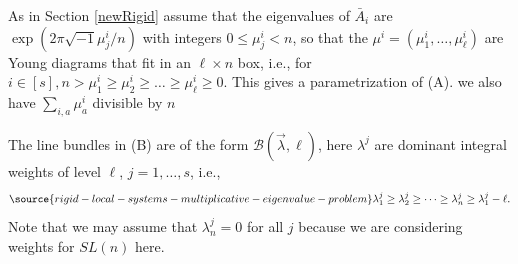 \iffalse
As in Section \ref{newRigid} assume  that the  eigenvalues of $\bar{A}_i$ are $\exp(2\pi\sqrt{-1}\mu_j^i/n)$ with integers $0\leq \mu_j^i<n$, so that the $\mu^i=(\mu^i_1,\dots,\mu^i_{\ell})$ are Young diagrams that fit in an $\ell\times n$ box, i.e.,  for $i\in [s], n> \mu^i_1\geq \mu^i_2\geq \dots \geq \mu^i_{\ell}\geq 0$. This gives a parametrization of (A). we also have $\sum_{i,a}\mu^i_a$ divisible by $n$

The line bundles in (B) are of the form $\mathcal{B}(\vec{\lambda},\ell)$, here $\lambda^j$ are dominant integral weights  of level $\ell$, $j=1,\dots,s$, i.e.,
\begin{equation}\label{weyl}
\source{rigid-local-systems-multiplicative-eigenvalue-problem}
\lambda^{j}_1\geq \lambda^{j}_2\geq \dots\geq \lambda^{j}_n\geq \lambda^{j}_1-\ell.
\end{equation}
Note that we may assume that $\lambda^j_n=0$ for all $j$ because we are considering weights for $SL(n)$ here.

